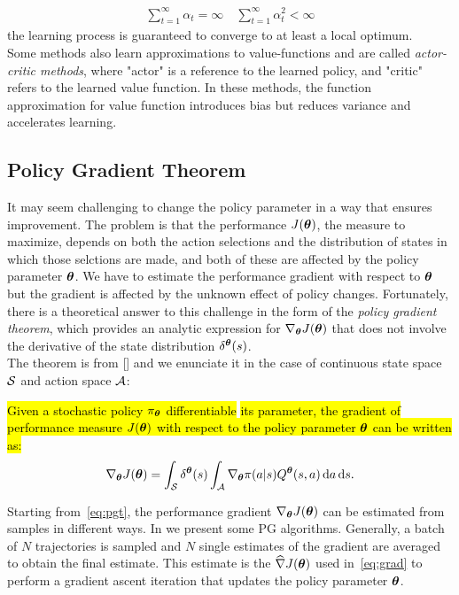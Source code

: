 \begin{align}\sum_{t=1}^{\infty}\alpha_t = \infty \quad \sum_{t=1}^{\infty}\alpha_t^2 < \infty\end{align} 
the learning process is guaranteed to converge to at least a local optimum.\\
\newline
Some methods also learn approximations to value-functions and are called \emph{actor-critic methods}, where "actor" is a reference to the learned policy, and "critic" refers to the learned value function. In these methods, the function approximation for value function introduces bias but reduces variance and accelerates learning.

\subsection{Policy Gradient Theorem} \label{subsec:pgt}
It may seem challenging to change the policy parameter in a way that ensures improvement. The problem is that the performance $J(\boldsymbol{\theta})$, \ie the measure to maximize, depends on both the action selections and the distribution of states in which those selctions are made, and both of these are affected by the policy parameter $\boldsymbol{\theta}$. We have to estimate the performance gradient with respect to $\boldsymbol{\theta}$ but the gradient is affected by the unknown effect of policy changes. Fortunately, there is a theoretical answer to this challenge in the form of the \emph{policy gradient theorem}, which provides an analytic expression for $\nabla_{\boldsymbol{\theta}}J(\boldsymbol{\theta})$ that does not involve the derivative of the state distribution $\delta^{\boldsymbol{\theta}}(s)$.\\
\newline
The theorem is from [\cite{Sutton1999PolicyGM}] and we enunciate it in the case of continuous state space $\mathcal{S}$ and action space $\mathcal{A}$:
\begin{theorem}
	\hl{Given a stochastic policy $\pi_{\boldsymbol{\theta}}$ differentiable} \wrt \hl{its parameter, the gradient of performance measure $J(\boldsymbol{\theta})$ with respect to the policy parameter $\boldsymbol{\theta}$ can be written as:}
	\begin{align} 
	\nabla_{\boldsymbol{\theta}}J(\boldsymbol{\theta}) = \int_{\mathcal{S}} \delta^{\boldsymbol{\theta}}(s) \int_{\mathcal{A}} \nabla_{\boldsymbol{\theta}} \pi(a|s) Q^{\boldsymbol{\theta}}(s,a) \,\mathrm{d} a \,\mathrm{d} s. \label{eq:pgt}
	\end{align}
\end{theorem}
\noindent Starting from~\eqref{eq:pgt}, the performance gradient $\nabla_{\boldsymbol{\theta}}J(\boldsymbol{\theta})$ can be estimated from samples in different ways. In  we present some \ac{PG} algorithms. Generally, a batch of $N$ trajectories is sampled and $N$ single estimates of the gradient are averaged to obtain the final estimate. This estimate is the $\widehat{\nabla }J(\boldsymbol{\theta})$ used in~\eqref{eq:grad} to perform a gradient ascent iteration that updates the policy parameter $\boldsymbol{\theta}$.

